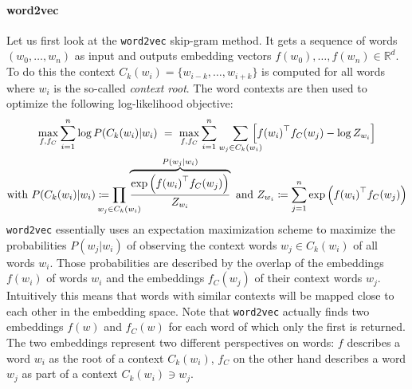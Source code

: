 \paragraph{word2vec}
Let us first look at the \texttt{word2vec} skip-gram method.
It gets a sequence of words $(w_0, \dots, w_n)$ as input and outputs embedding vectors $f(w_0), \dots, f(w_n) \in \mathbb{R}^d$.
To do this the context $C_k(w_i) = \{ w_{i-k}, \dots, w_{i + k} \}$ is computed for all words where $w_i$ is the so-called \textit{context root}.
The word contexts are then used to optimize the following log-likelihood objective:
\begin{gather}
	\max_{f, f_C} \sum_{i = 1}^n \log P(C_k(w_i) | w_i)\ =\ \max_{f, f_C} \sum_{i = 1}^n \smashoperator[r]{\sum_{w_j \in C_k(w_i)}}\, \left[ {f(w_i)}^\top f_C(w_j) - \log Z_{w_i} \right] \label{eq:related:gcr:embed:word2vec}\\
	\text{with } P(C_k(w_i) | w_i) \coloneqq \prod_{\mathclap{w_j \in C_k(w_i)}}\, \overbrace{\frac{\exp\left({f(w_i)}^\top f_C(w_j)\right)}{Z_{w_i}}}^{P(w_j | w_i)}
	\text{ and } Z_{w_i} \coloneqq \sum_{j = 1}^n \exp\left({f(w_i)}^\top f_C(w_j)\right) \nonumber
\end{gather}
\texttt{word2vec} essentially uses an expectation maximization scheme to maximize the probabilities $P(w_j | w_i)$ of observing the context words $w_j \in C_k(w_i)$ of all words $w_i$.
Those probabilities are described by the overlap of the embeddings $f(w_i)$ of words $w_i$ and the embeddings $f_C(w_j)$ of their context words $w_j$.
Intuitively this means that words with similar contexts will be mapped close to each other in the embedding space.
Note that \texttt{word2vec} actually finds two embeddings $f(w)$ and $f_C(w)$ for each word of which only the first is returned.
The two embeddings represent two different perspectives on words: $f$ describes a word $w_i$ as the root of a context $C_k(w_i)$, $f_C$ on the other hand describes a word $w_j$ as part of a context $C_k(w_i) \ni w_j$.

